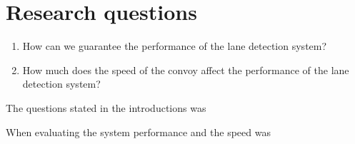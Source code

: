 \section{Research questions}

\begin{enumerate}  
\item How can we guarantee the performance of the lane detection system?
\item How much does the speed of the convoy affect the performance of the lane detection system?
\end{enumerate}

The questions stated in the introductions was

When evaluating the system performance and the speed was 